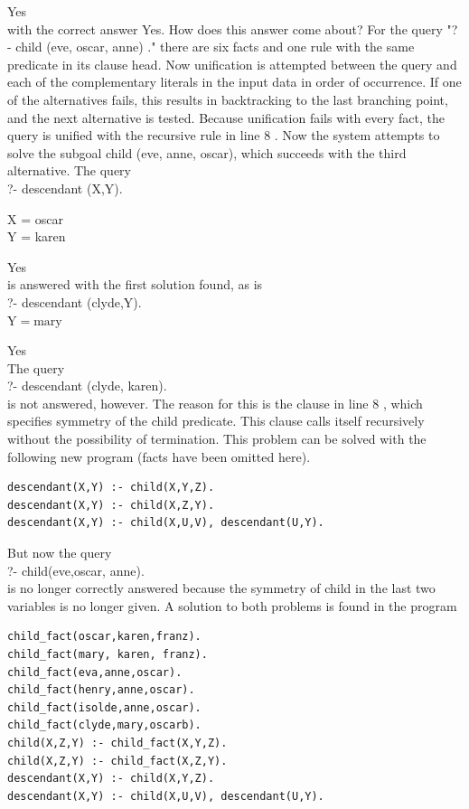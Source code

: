 \documentclass[10pt]{book}
\begin{document}
\begin{center}
Yes\\
with the correct answer Yes. How does this answer come about? For the query "? - child (eve, oscar, anne) ." there are six facts and one rule with the same predicate in its clause head. Now unification is attempted between the query and each of the complementary literals in the input data in order of occurrence. If one of the alternatives fails, this results in backtracking to the last branching point, and the next alternative is tested. Because unification fails with every fact, the query is unified with the recursive rule in line 8 . Now the system attempts to solve the subgoal child (eve, anne, oscar), which succeeds with the third alternative. The query\\
?- descendant (X,Y).

X = oscar\\
Y = karen

Yes\\
is answered with the first solution found, as is\\
?- descendant (clyde,Y).\\
$\mathrm{Y}=\mathrm{mar} \mathrm{y}$

Yes\\
The query\\
?- descendant (clyde, karen).\\
is not answered, however. The reason for this is the clause in line 8 , which specifies symmetry of the child predicate. This clause calls itself recursively without the possibility of termination. This problem can be solved with the following new program (facts have been omitted here).

\begin{verbatim}
descendant(X,Y) :- child(X,Y,Z).
descendant(X,Y) :- child(X,Z,Y).
descendant(X,Y) :- child(X,U,V), descendant(U,Y).
\end{verbatim}

But now the query\\
?- child(eve,oscar, anne).\\
is no longer correctly answered because the symmetry of child in the last two variables is no longer given. A solution to both problems is found in the program

\begin{verbatim}
child_fact(oscar,karen,franz).
child_fact(mary, karen, franz).
child_fact(eva,anne,oscar).
child_fact(henry,anne,oscar).
child_fact(isolde,anne,oscar).
child_fact(clyde,mary,oscarb).
child(X,Z,Y) :- child_fact(X,Y,Z).
child(X,Z,Y) :- child_fact(X,Z,Y).
descendant(X,Y) :- child(X,Y,Z).
descendant(X,Y) :- child(X,U,V), descendant(U,Y).
\end{verbatim}


\end{center}
\end{document}
